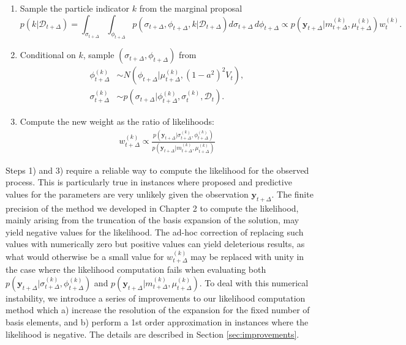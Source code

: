 \documentclass[10pt]{article}
\begin{document}
\begin{enumerate}[1)]
\item Sample the particle indicator $k$ from the marginal proposal
  \[
    p(k| \mathcal{D}_{t+\Delta})= \displaystyle
    \int_{\sigma_{t+\Delta}} \displaystyle \int_{\phi_{t+\Delta}}
    p(\sigma_{t+\Delta}, \phi_{t+\Delta}, k | \mathcal{D}_{t+\Delta})
    d\sigma_{t+\Delta} \,d\phi_{t+\Delta} \propto p(\mathbf{y}_{t+\Delta} | m^{(k)}_{t+\Delta}, \mu^{(k)}_{t+\Delta}) w^{(k)}_t.
  \]
\item Conditional on $k$, sample $(\sigma_{t+\Delta}, \phi_{t+\Delta})$ from
  \begin{align*}
    \phi_{t+\Delta}^{(k)} &\sim N(\phi_{t+\Delta} | \mu_{t+\Delta}^{(k)}, (1-a^2)^2 V_t), \\
    \sigma_{t+\Delta}^{(k)} &\sim p(\sigma_{t+\Delta} | \phi_{t+\Delta}^{(k)}, \sigma_{t}^{(k)}, \mathcal{D}_t).
  \end{align*}
\item Compute the new weight as the ratio of likelihoods:
  \begin{align*}
    w_{t+\Delta}^{(k)} \propto \frac{p(\mathbf{y}_{t+\Delta} | \sigma^{(k)}_{t+\Delta}, \phi^{(k)}_{t+\Delta})}{p(\mathbf{y}_{t+\Delta} | m^{(k)}_{t+\Delta}, \mu^{(k)}_{t+\Delta})}
  \end{align*}
\end{enumerate}
Steps 1) and 3) require a reliable way to compute the likelihood for
the observed process. This is particularly true in instances where
proposed and predictive values for the parameters are very unlikely
given the observation $\mathbf{y}_{t+\Delta}$. The finite precision of
the method we developed in Chapter 2 to compute the likelihood, mainly arising from
the truncation of the basis expansion of the solution, may yield
negative values for the likelihood. The ad-hoc correction of replacing
such values with numerically zero but positive values can yield
deleterious results, as what would otherwise be a small value for
$w_{t+\Delta}^{(k)}$ may be replaced with unity in the case where the
likelihood computation fails when evaluating both
$p(\mathbf{y}_{t+\Delta} | \sigma^{(k)}_{t+\Delta},
\phi^{(k)}_{t+\Delta})$ and
$p(\mathbf{y}_{t+\Delta} | m^{(k)}_{t+\Delta},
\mu^{(k)}_{t+\Delta})$. To deal with this numerical instability, we
introduce a series of improvements to our likelihood computation
method which a) increase the resolution of the expansion for the fixed
number of basis elements, and b) perform a 1st order approximation in
instances where the likelihood is negative. The details are described
in Section \ref{sec:improvements}.
\end{document}
